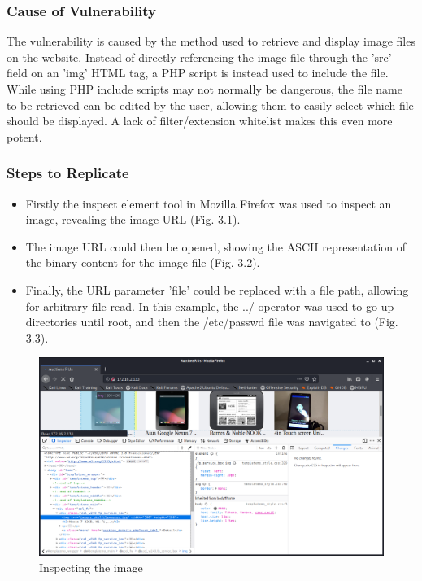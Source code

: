 \documentclass{report}
\begin{document}
\subsubsection{Cause of Vulnerability}
The vulnerability is caused by the method used to retrieve and display image files on the website. Instead of directly referencing the image file through the 'src' field on an 'img' HTML tag, a PHP script is instead used to include the file.\\ 
While using PHP include scripts may not normally be dangerous, the file name to be retrieved can be edited by the user, allowing them to easily select which file should be displayed. A lack of filter/extension whitelist makes this even more potent.
\subsubsection{Steps to Replicate}
\begin{itemize}
		\item Firstly the inspect element tool in Mozilla Firefox was used to inspect an image, revealing the image URL (Fig. 3.1).
		\item The image URL could then be opened, showing the ASCII representation of the binary content for the image file (Fig. 3.2).
		\item Finally, the URL parameter 'file' could be replaced with a file path, allowing for arbitrary file read. In this example, the ../ operator was used to go up directories until root, and then the /etc/passwd file was navigated to (Fig. 3.3).
\end{itemize}
\begin{figure}[!htb]
	\centering
	\includegraphics[scale=0.4]{img/pathtraversal1.png}
	\caption{Inspecting the image}
\end{figure}
\end{document}
